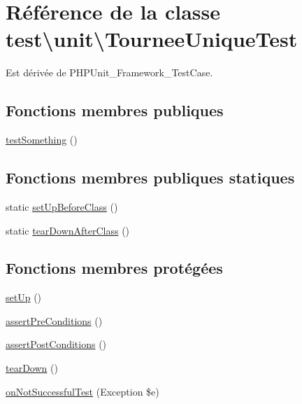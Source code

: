 \hypertarget{classtest_1_1unit_1_1TourneeUniqueTest}{}\section{Référence de la classe test\textbackslash{}unit\textbackslash{}Tournee\+Unique\+Test}
\label{classtest_1_1unit_1_1TourneeUniqueTest}


Est dérivée de P\+H\+P\+Unit\+\_\+\+Framework\+\_\+\+Test\+Case.

\subsection*{Fonctions membres publiques}
\begin{DoxyCompactItemize}
\item 
\hyperlink{classtest_1_1unit_1_1TourneeUniqueTest_a86c9af2a604cbf7428ef4d3704c93f1f}{test\+Something} ()
\end{DoxyCompactItemize}
\subsection*{Fonctions membres publiques statiques}
\begin{DoxyCompactItemize}
\item 
static \hyperlink{classtest_1_1unit_1_1TourneeUniqueTest_a40e2bbddcc352427439a49a48b63465d}{set\+Up\+Before\+Class} ()
\item 
static \hyperlink{classtest_1_1unit_1_1TourneeUniqueTest_a49de2edebe74d0ac9256be52f863200d}{tear\+Down\+After\+Class} ()
\end{DoxyCompactItemize}
\subsection*{Fonctions membres protégées}
\begin{DoxyCompactItemize}
\item 
\hyperlink{classtest_1_1unit_1_1TourneeUniqueTest_a7a0359a1d6f6a219beeb5023af00919b}{set\+Up} ()
\item 
\hyperlink{classtest_1_1unit_1_1TourneeUniqueTest_a0c387a7c40014b12cd88e948929721f2}{assert\+Pre\+Conditions} ()
\item 
\hyperlink{classtest_1_1unit_1_1TourneeUniqueTest_a397a63e36ddfd7f6a661048e7f21d4b0}{assert\+Post\+Conditions} ()
\item 
\hyperlink{classtest_1_1unit_1_1TourneeUniqueTest_a2de9d1554059563e8325ab42981f7679}{tear\+Down} ()
\item 
\hyperlink{classtest_1_1unit_1_1TourneeUniqueTest_a30c0c2dcb3ee75bb6eaeada1acb4d525}{on\+Not\+Successful\+Test} (Exception \$e)
\end{DoxyCompactItemize}


